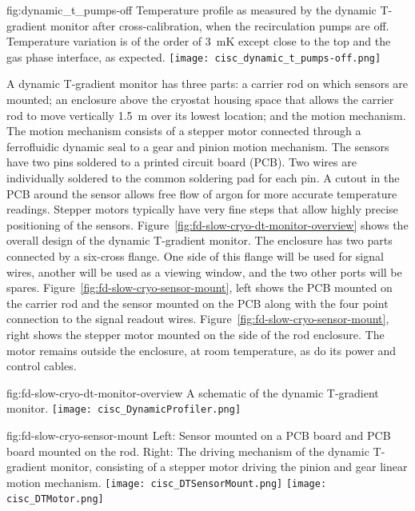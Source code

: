 \begin{dunefigure}{fig:dynamic_t_pumps-off}
  {Temperature profile as measured by the dynamic T-gradient monitor after cross-calibration, when the recirculation pumps are off. Temperature variation is of the order of \SI{3}{mK} except close to the top and the gas phase interface, as expected.}
  \texttt{[image: cisc\_dynamic\_t\_pumps-off.png]}%
\end{dunefigure}


A dynamic T-gradient monitor has three parts: a carrier rod on which sensors are mounted; an enclosure above the cryostat housing space that allows the carrier rod to move vertically  \SI{1.5}{m} over its lowest location; and the motion mechanism. The motion mechanism consists of a stepper motor connected through a ferrofluidic dynamic seal to a gear and pinion motion mechanism. The sensors have two pins soldered to a printed circuit board (PCB). 
Two wires are individually soldered to the common soldering pad for each pin.  A cutout in the PCB around the sensor allows free flow of argon for more accurate temperature readings.  Stepper motors typically have very fine steps that allow highly precise positioning of the sensors.  Figure~\ref{fig:fd-slow-cryo-dt-monitor-overview} shows the overall design of the dynamic T-gradient monitor. %
The enclosure has two parts connected by a six-cross flange. One side of this flange will be used for signal wires, another will be used as a viewing window, and the two other ports will be spares. Figure~\ref{fig:fd-slow-cryo-sensor-mount}, left shows the PCB mounted on the carrier rod and the sensor mounted on the PCB along with the four point connection to the signal readout wires. %
Figure~\ref{fig:fd-slow-cryo-sensor-mount}, right shows the stepper motor mounted on the side of the rod enclosure. The motor remains outside the enclosure, at room temperature, %
as do its power and control cables. %

\begin{dunefigure}{fig:fd-slow-cryo-dt-monitor-overview}
  {%
  A schematic of the dynamic T-gradient monitor.}
 \texttt{[image: cisc\_DynamicProfiler.png]}
\end{dunefigure}
\begin{dunefigure}{fig:fd-slow-cryo-sensor-mount}
  {Left: Sensor mounted on a PCB board and PCB board mounted on the rod. Right:
    The driving mechanism of the dynamic T-gradient monitor, consisting of a stepper motor driving the pinion and gear linear motion mechanism. }
  \texttt{[image: cisc\_DTSensorMount.png]}
  \hspace{3cm}%
  \texttt{[image: cisc\_DTMotor.png]}
\end{dunefigure}


